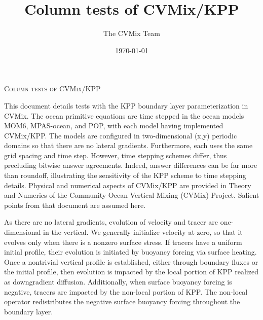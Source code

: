 \documentclass[fleqn,10pt]{book}
\title{\sc Column tests of CVMix/KPP}
\date{\today}
\author[$\star$]{The CVMix Team}
\begin{document}
\maketitle 
\thispagestyle{empty}


\begin{center}
{\scshape \Large Column tests of CVMix/KPP} 
\end{center}

This document details tests with the KPP \citep{LargeKPP} boundary
layer parameterization in CVMix.  The ocean primitive equations are
time stepped in the ocean models MOM6, MPAS-ocean, and POP, with each
model having implemented CVMix/KPP.  The models are configured in
two-dimensional (x,y) periodic domains so that there are no lateral
gradients.  Furthermore, each uses the same grid spacing and time
step.  However, time stepping schemes differ, thus precluding bitwise
answer agreements.  Indeed, answer differences can be far more than
roundoff, illustrating the sensitivity of the KPP scheme to time
stepping details.  Physical and numerical aspects of CVMix/KPP are
provided in {\sc Theory and Numerics of the Community Ocean Vertical
  Mixing (CVMix) Project}.  Salient points from that document are
assumed here.

As there are no lateral gradients, evolution of velocity and tracer
are one-dimensional in the vertical.  We generally initialize velocity
at zero, so that it evolves only when there is a nonzero surface
stress.  If tracers have a uniform initial profile, their evolution is
initiated by buoyancy forcing via surface heating.  Once a nontrivial
vertical profile is established, either through boundary fluxes or the
initial profile, then evolution is impacted by the local portion of
KPP realized as downgradient diffusion.  Additionally, when surface
buoyancy forcing is negative, tracers are impacted by the non-local
portion of KPP.  The non-local operator redistributes the negative
surface buoyancy forcing throughout the boundary layer.


\dominitoc
\tableofcontents
\listoffigures








\newpage 


\gdef\rightmark{\scshape BIBLIOGRAPHY}

\end{document}
